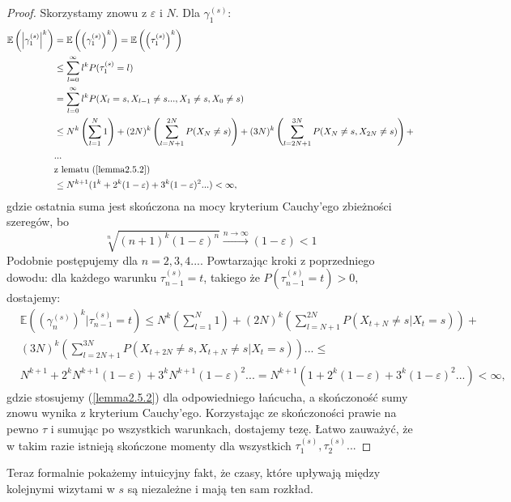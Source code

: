 \documentclass[a4paper]{article}
\theoremstyle{defn}
\theoremstyle{theorem}
\theoremstyle{lemma}
\theoremstyle{cor}
\theoremstyle{fact}
\begin{document}
\begin{proof} Skorzystamy znowu z $\varepsilon$ i $N$. Dla $\gamma_1^{(s)}$:
\begin{align*}
    \mathbb{E}\left(\left|\gamma_1^{(s)}\right|^k\right) &= \mathbb{E}\left(\left(\gamma_1^{(s)}\right)^k\right) = \mathbb{E}\left(\left(\tau_1^{(s)}\right)^k\right)\\
    &\leq \sum\limits_{l = 0}^{\infty} l^k P(\tau_1^{(s)} = l) \\
    &= \sum\limits_{l = 0}^{\infty} l^k P(X_l = s, X_{l-1} \neq s..., X_1 \neq s, X_0 \neq s)\\
    &\leq N^k\left(\sum\limits_{l = 1}^{N} 1\right) + (2N)^k\left(\sum\limits_{l = N+1}^{2N} P(X_N \neq s)\right) + (3N)^k\left(\sum\limits_{l = 2N+1}^{3N} P(X_N \neq s, X_{2N} \neq s)\right)+\\&...\\
    &\text{z lematu (\ref{lemma2.5.2})}\\
    &\leq N^{k+1}(1^{k} + 2^{k}(1-\varepsilon) + 3^{k}(1 - \varepsilon)^2 ...) < \infty,
\end{align*}
gdzie ostatnia suma jest skończona na mocy kryterium Cauchy'ego zbieżności szeregów, bo
$$\sqrt[n]{(n+1)^{k}(1-\varepsilon)^n} \xrightarrow{n \to \infty} (1-\varepsilon) < 1$$
Podobnie postępujemy dla $n=2,3,4...$. Powtarzając kroki z poprzedniego dowodu: dla każdego warunku $\tau^{(s)}_{n-1} = t$, takiego że $P(\tau^{(s)}_{n-1} = t) > 0,$ dostajemy:
\begin{align*}
    &\mathbb{E}\left(\left(\gamma^{(s)}_n\right)^k|\tau^{(s)}_{n-1} = t\right) \leq
N^k \left(\sum\limits_{l = 1}^{N} 1\right) + (2N)^k\left(\sum\limits_{l = N+1}^{2N} P(X_{t+N} \neq s| X_t = s)\right) +\\ &(3N)^k\left(\sum\limits_{l = 2N+1}^{3N} P(X_{t+2N} \neq s, X_{t+N} \neq s| X_t = s)\right)...\leq\\
    &N^{k+1} + 2^k N^{k+1}(1-\varepsilon) + 3^k N^{k+1}(1-\varepsilon)^2 ... = N^{k+1}(1 + 2^{k}(1-\varepsilon) + 3^{k}(1 - \varepsilon)^2 ...) < \infty,
\end{align*}
gdzie stosujemy (\ref{lemma2.5.2}) dla odpowiedniego łańcucha, a skończoność sumy znowu wynika z kryterium Cauchy'ego. Korzystając ze skończoności prawie na pewno $\tau$ i sumując po wszystkich warunkach, dostajemy tezę. Łatwo zauważyć, że w takim razie istnieją skończone momenty dla wszystkich $\tau_1^{(s)}, \tau_2^{(s)}...$
\end{proof}
Teraz formalnie pokażemy intuicyjny fakt, że czasy, które upływają między kolejnymi wizytami w $s$ są niezależne i mają ten sam rozkład.
\end{document}
